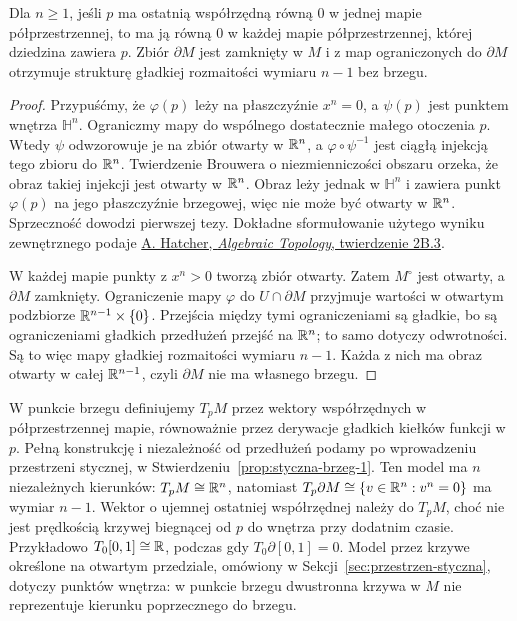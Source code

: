 \begin{stwierdzenie}
\label{prop:brzeg-niezalezny-1}
Dla $n\geq1$, jeśli $p$ ma ostatnią współrzędną równą $0$ w jednej
mapie półprzestrzennej, to ma ją równą $0$ w każdej
mapie półprzestrzennej, której dziedzina zawiera $p$.
Zbiór $\partial M$ jest zamknięty w $M$ i z map ograniczonych
do $\partial M$ otrzymuje strukturę gładkiej
rozmaitości wymiaru $n-1$ bez brzegu.
\end{stwierdzenie}
\begin{proof}
Przypuśćmy, że $\varphi(p)$ leży na płaszczyźnie
$x^n=0$, a $\psi(p)$ jest punktem wnętrza $\mathbb H^n$.
Ograniczmy mapy do wspólnego dostatecznie małego otoczenia
$p$. Wtedy $\psi$ odwzorowuje je na zbiór otwarty w $\mathbb{R}^n$,
a $\varphi\circ\psi^{-1}$ jest ciągłą injekcją tego zbioru
do $\mathbb{R}^n$. Twierdzenie Brouwera o niezmienniczości obszaru
orzeka, że obraz takiej injekcji jest otwarty w $\mathbb{R}^n$.
Obraz leży jednak w $\mathbb H^n$ i zawiera punkt
$\varphi(p)$ na jego płaszczyźnie brzegowej, więc nie może
być otwarty w $\mathbb{R}^n$. Sprzeczność dowodzi pierwszej tezy.
Dokładne sformułowanie użytego wyniku zewnętrznego podaje
\href{https://pi.math.cornell.edu/~hatcher/AT/AT.pdf}
{A. Hatcher, \emph{Algebraic Topology}, twierdzenie 2B.3}.

W każdej mapie punkty z $x^n>0$ tworzą zbiór otwarty.
Zatem $M^\circ$ jest otwarty, a $\partial M$ zamknięty.
Ograniczenie mapy $\varphi$ do
$U\cap\partial M$ przyjmuje wartości w otwartym
podzbiorze $\mathbb{R}^{n-1}\times\{0\}$. Przejścia między
tymi ograniczeniami są gładkie, bo są ograniczeniami
gładkich przedłużeń przejść na $\mathbb{R}^n$; to samo dotyczy
odwrotności. Są to więc mapy gładkiej rozmaitości
wymiaru $n-1$. Każda z nich ma obraz otwarty w całej
$\mathbb{R}^{n-1}$, czyli $\partial M$ nie ma własnego brzegu.
\end{proof}

W punkcie brzegu definiujemy $T_pM$ przez
wektory współrzędnych w półprzestrzennej mapie,
równoważnie przez derywacje gładkich kiełków
funkcji w $p$. Pełną konstrukcję i niezależność od przedłużeń
podamy po wprowadzeniu przestrzeni stycznej, w
Stwierdzeniu~\ref{prop:styczna-brzeg-1}. Ten model ma $n$ niezależnych
kierunków: $T_pM\cong\mathbb{R}^n$, natomiast
$T_p\partial M\cong\{v\in\mathbb{R}^n:v^n=0\}$ ma wymiar $n-1$.
Wektor o ujemnej ostatniej współrzędnej należy do $T_pM$,
choć nie jest prędkością krzywej biegnącej od $p$ do wnętrza
przy dodatnim czasie. Przykładowo $T_0[0,1]\cong\mathbb{R}$,
podczas gdy $T_0\partial[0,1]=0$.
Model przez krzywe określone na otwartym przedziale,
omówiony w Sekcji~\ref{sec:przestrzen-styczna},
dotyczy punktów wnętrza: w punkcie brzegu
dwustronna krzywa w $M$ nie reprezentuje
kierunku poprzecznego do brzegu.

